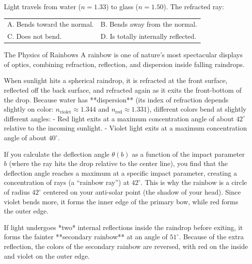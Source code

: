 \begin{checkpoint}[9.1]
Light travels from water ($n = 1.33$) to glass ($n = 1.50$). The refracted ray:
\newline
\begin{tabular}{ll}
  A. Bends toward the normal. & B. Bends away from the normal. \\
  C. Does not bend. & D. Is totally internally reflected.
\end{tabular}
\end{checkpoint}

\begin{supplementary}{The Physics of Rainbows}
A rainbow is one of nature's most spectacular displays of optics, combining refraction, reflection, and dispersion inside falling raindrops.

When sunlight hits a spherical raindrop, it is refracted at the front surface, reflected off the back surface, and refracted again as it exits the front-bottom of the drop.
Because water has **dispersion** (its index of refraction depends slightly on color: $n_{\text{violet}} \approx 1.344$ and $n_{\text{red}} \approx 1.331$), different colors bend at slightly different angles:
- Red light exits at a maximum concentration angle of about $42^\circ$ relative to the incoming sunlight.
- Violet light exits at a maximum concentration angle of about $40^\circ$.

If you calculate the deflection angle $\theta(b)$ as a function of the impact parameter $b$ (where the ray hits the drop relative to the center line), you find that the deflection angle reaches a maximum at a specific impact parameter, creating a concentration of rays (a ``rainbow ray'') at $42^\circ$. This is why the rainbow is a circle of radius $42^\circ$ centered on your anti-solar point (the shadow of your head). Since violet bends more, it forms the inner edge of the primary bow, while red forms the outer edge.

If light undergoes *two* internal reflections inside the raindrop before exiting, it forms the fainter **secondary rainbow** at an angle of $51^\circ$. Because of the extra reflection, the colors of the secondary rainbow are reversed, with red on the inside and violet on the outer edge.
\end{supplementary}

